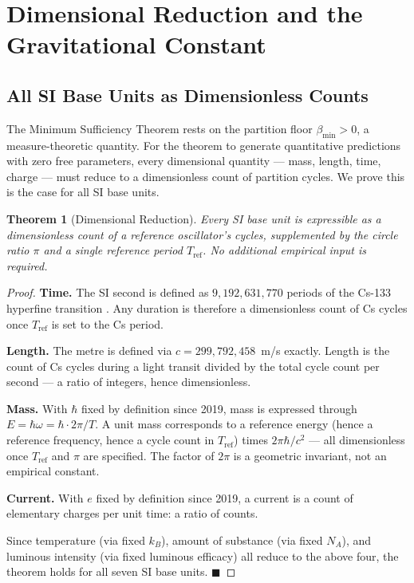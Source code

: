 \documentclass[11pt,twocolumn,a4paper]{article}
\theoremstyle{plain}
\newtheorem{theorem}{Theorem}[section]
\theoremstyle{definition}
\theoremstyle{remark}
\newcommand{\bmin}{\beta_{\min}}
\renewcommand{\qed}{\hfill$\blacksquare$}
\begin{document}
\section{Dimensional Reduction and the Gravitational Constant}
\label{sec:gravity}

\subsection{All SI Base Units as Dimensionless Counts}

The Minimum Sufficiency Theorem rests on the partition floor $\bmin > 0$, a
measure-theoretic quantity. For the theorem to generate quantitative predictions
with zero free parameters, every dimensional quantity --- mass, length, time,
charge --- must reduce to a dimensionless count of partition cycles. We prove
this is the case for all SI base units.

\begin{theorem}[Dimensional Reduction]
\label{thm:dimred}
Every SI base unit is expressible as a dimensionless count of a reference
oscillator's cycles, supplemented by the circle ratio $\pi$ and a single
reference period $T_{\mathrm{ref}}$. No additional empirical input is required.
\end{theorem}

\begin{proof}
\textbf{Time.} The SI second is defined as $9{,}192{,}631{,}770$ periods of the
Cs-133 hyperfine transition \citep{codata2018}. Any duration is therefore a
dimensionless count of Cs cycles once $T_{\mathrm{ref}}$ is set to the Cs
period.

\textbf{Length.} The metre is defined via $c = 299{,}792{,}458$~m/s exactly.
Length is the count of Cs cycles during a light transit divided by the total
cycle count per second --- a ratio of integers, hence dimensionless.

\textbf{Mass.} With $\hbar$ fixed by definition since 2019, mass is expressed
through $E = \hbar\omega = \hbar\cdot 2\pi/T$. A unit mass corresponds to a
reference energy (hence a reference frequency, hence a cycle count in $T_{\mathrm{ref}}$)
times $2\pi\hbar/c^2$ --- all dimensionless once $T_{\mathrm{ref}}$ and $\pi$
are specified. The factor of $2\pi$ is a geometric invariant, not an empirical
constant.

\textbf{Current.} With $e$ fixed by definition since 2019, a current is a count
of elementary charges per unit time: a ratio of counts.

Since temperature (via fixed $k_B$), amount of substance (via fixed $N_A$), and
luminous intensity (via fixed luminous efficacy) all reduce to the above four,
the theorem holds for all seven SI base units. \qed
\end{proof}
\end{document}

